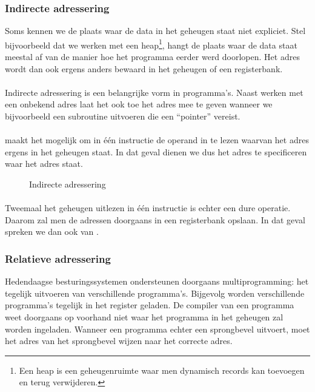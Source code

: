 \subsubsection{Indirecte adressering}
Soms kennen we de plaats waar de data in het geheugen staat niet expliciet. Stel bijvoorbeeld dat we werken met een heap\footnote{Een heap is een geheugenruimte waar men dynamisch records kan toevoegen en terug verwijderen.}, hangt de plaats waar de data staat meestal af van de manier hoe het programma eerder werd doorlopen. Het adres wordt dan ook ergens anders bewaard in het geheugen of een registerbank.
\paragraph{}
Indirecte adressering is een belangrijke vorm in programma's. Naast werken met een onbekend adres laat het ook toe het adres mee te geven wanneer we bijvoorbeeld een subroutine uitvoeren die een ``pointer'' vereist.
\paragraph{}
 maakt het mogelijk om in \'e\'en instructie de operand in te lezen waarvan het adres ergens in het geheugen staat. In dat geval dienen we dus het adres te specificeren waar het adres staat.
\begin{figure}[hbt]
\centering
{}
\caption{Indirecte adressering}
\end{figure}
\paragraph{}
Tweemaal het geheugen uitlezen in \'e\'en instructie is echter een dure operatie. Daarom zal men de adressen doorgaans in een registerbank opslaan. In dat geval spreken we dan ook van .
\subsubsection{Relatieve adressering}
Hedendaagse besturingssystemen ondersteunen doorgaans multiprogramming: het tegelijk uitvoeren van verschillende programma's. Bijgevolg worden verschillende programma's tegelijk in het register geladen. De compiler van een programma weet doorgaans op voorhand niet waar het programma in het geheugen zal worden ingeladen. Wanneer een programma echter een sprongbevel uitvoert, moet het adres van het sprongbevel wijzen naar het correcte adres.
